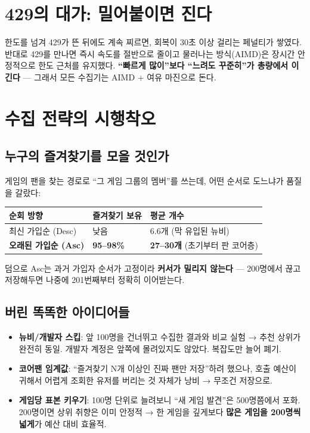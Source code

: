 \documentclass[11pt]{article}
\begin{document}
\section{429의 대가: 밀어붙이면 진다}

한도를 넘겨 429가 뜬 뒤에도 계속 찌르면, 회복이 30초 이상 걸리는 페널티가 쌓였다.
반대로 429를 만나면 즉시 속도를 절반으로 줄이고 물러나는 방식(AIMD)은
장시간 안정적으로 한도 근처를 유지했다. \textbf{``빠르게 많이''보다 ``느려도 꾸준히''가
총량에서 이긴다} --- 그래서 모든 수집기는 AIMD + 여유 마진으로 돈다.

\section{수집 전략의 시행착오}

\subsection{누구의 즐겨찾기를 모을 것인가}
게임의 팬을 찾는 경로로 ``그 게임 그룹의 멤버''를 쓰는데, 어떤 순서로 도느냐가
품질을 갈랐다:

\begin{center}
\begin{tabular}{lll}
\toprule
순회 방향 & 즐겨찾기 보유 & 평균 개수 \\
\midrule
최신 가입순 (Desc) & 낮음 & 6.6개 (막 유입된 뉴비) \\
\textbf{오래된 가입순 (Asc)} & \textbf{95--98\%} & \textbf{27--30개} (초기부터 판 코어층) \\
\bottomrule
\end{tabular}
\end{center}

덤으로 Asc는 과거 가입자 순서가 고정이라 \textbf{커서가 밀리지 않는다} ---
200명에서 끊고 저장해두면 나중에 201번째부터 정확히 이어받는다.

\subsection{버린 똑똑한 아이디어들}
\begin{itemize}
  \item \textbf{뉴비/개발자 스킵}: 앞 100명을 건너뛰고 수집한 결과와 비교 실험 →
        추천 상위가 완전히 동일. 개발자 계정은 앞쪽에 몰려있지도 않았다. 복잡도만 늘어 폐기.
  \item \textbf{코어팬 임계값}: ``즐겨찾기 N개 이상인 진짜 팬만 저장''하려 했으나,
        호출 예산이 귀해서 어렵게 조회한 유저를 버리는 것 자체가 낭비 → 무조건 저장으로.
  \item \textbf{게임당 표본 키우기}: 100명 단위로 늘려보니 ``새 게임 발견''은 500명쯤에서
        포화. 200명이면 상위 취향은 이미 안정적 → 한 게임을 깊게보다 \textbf{많은 게임을
        200명씩 넓게}가 예산 대비 효율적.
\end{itemize}
\end{document}
